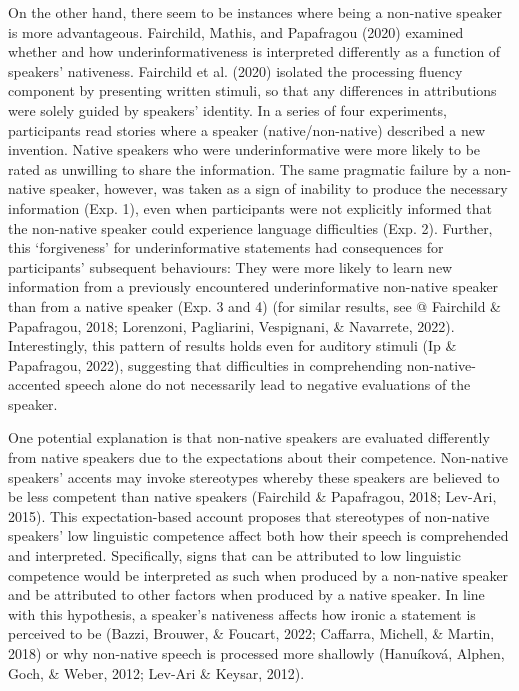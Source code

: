 \documentclass[
  man,floatsintext]{apa7}
\begin{document}
On the other hand, there seem to be instances where being a non-native speaker is more advantageous. Fairchild, Mathis, and Papafragou (2020) examined whether and how underinformativeness is interpreted differently as a function of speakers' nativeness. Fairchild et al. (2020) isolated the processing fluency component by presenting written stimuli, so that any differences in attributions were solely guided by speakers' identity. In a series of four experiments, participants read stories where a speaker (native/non-native) described a new invention. Native speakers who were underinformative were more likely to be rated as unwilling to share the information. The same pragmatic failure by a non-native speaker, however, was taken as a sign of inability to produce the necessary information (Exp. 1), even when participants were not explicitly informed that the non-native speaker could experience language difficulties (Exp. 2). Further, this `forgiveness' for underinformative statements had consequences for participants' subsequent behaviours: They were more likely to learn new information from a previously encountered underinformative non-native speaker than from a native speaker (Exp. 3 and 4) (for similar results, see @ Fairchild \& Papafragou, 2018; Lorenzoni, Pagliarini, Vespignani, \& Navarrete, 2022). Interestingly, this pattern of results holds even for auditory stimuli (Ip \& Papafragou, 2022), suggesting that difficulties in comprehending non-native-accented speech alone do not necessarily lead to negative evaluations of the speaker.

One potential explanation is that non-native speakers are evaluated differently from native speakers due to the expectations about their competence. Non-native speakers' accents may invoke stereotypes whereby these speakers are believed to be less competent than native speakers (Fairchild \& Papafragou, 2018; Lev-Ari, 2015). This expectation-based account proposes that stereotypes of non-native speakers' low linguistic competence affect both how their speech is comprehended and interpreted. Specifically, signs that can be attributed to low linguistic competence would be interpreted as such when produced by a non-native speaker and be attributed to other factors when produced by a native speaker. In line with this hypothesis, a speaker's nativeness affects how ironic a statement is perceived to be (Bazzi, Brouwer, \& Foucart, 2022; Caffarra, Michell, \& Martin, 2018) or why non-native speech is processed more shallowly (Hanuíková, Alphen, Goch, \& Weber, 2012; Lev-Ari \& Keysar, 2012).
\end{document}

